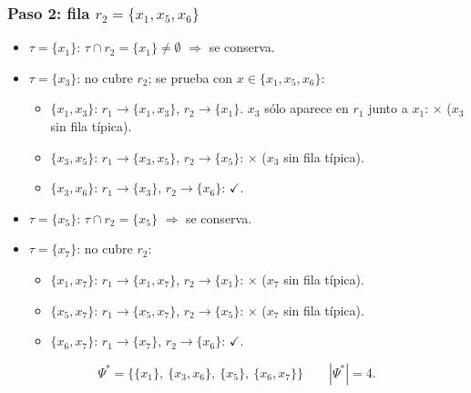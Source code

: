 \documentclass[11pt, a4paper]{article}
\theoremstyle{definition}
\theoremstyle{plain}
\newcommand{\Psis}{\Psi^{*}}
\newcommand{\x}[1]{x_{#1}}
\newcommand{\cj}[1]{\{#1\}}
\newcommand{\si}{\textcolor{green!50!black}{\ensuremath{\checkmark}}}
\newcommand{\no}{\textcolor{red!70!black}{\ensuremath{\times}}}
\begin{document}
\subsubsection*{Paso 2: fila $r_2=\cj{\x1,\x5,\x6}$}
\begin{itemize}[nosep]
\item $\tau=\cj{\x1}$: $\tau\cap r_2=\cj{\x1}\neq\emptyset$ $\Rightarrow$ se conserva.
\item $\tau=\cj{\x3}$: no cubre $r_2$; se prueba con $x\in\cj{\x1,\x5,\x6}$:
  \begin{itemize}[nosep]
  \item $\cj{\x1,\x3}$: $r_1\to\cj{\x1,\x3}$, $r_2\to\cj{\x1}$. $\x3$ sólo aparece en $r_1$ junto a $\x1$: \no{} ($\x3$ sin fila típica).
  \item $\cj{\x3,\x5}$: $r_1\to\cj{\x3,\x5}$, $r_2\to\cj{\x5}$: \no{} ($\x3$ sin fila típica).
  \item $\cj{\x3,\x6}$: $r_1\to\cj{\x3}$, $r_2\to\cj{\x6}$: \si.
  \end{itemize}
\item $\tau=\cj{\x5}$: $\tau\cap r_2=\cj{\x5}$ $\Rightarrow$ se conserva.
\item $\tau=\cj{\x7}$: no cubre $r_2$:
  \begin{itemize}[nosep]
  \item $\cj{\x1,\x7}$: $r_1\to\cj{\x1,\x7}$, $r_2\to\cj{\x1}$: \no{} ($\x7$ sin fila típica).
  \item $\cj{\x5,\x7}$: $r_1\to\cj{\x5,\x7}$, $r_2\to\cj{\x5}$: \no{} ($\x7$ sin fila típica).
  \item $\cj{\x6,\x7}$: $r_1\to\cj{\x7}$, $r_2\to\cj{\x6}$: \si.
  \end{itemize}
\end{itemize}
\[
\Psis=\big\{\cj{\x1},\ \cj{\x3,\x6},\ \cj{\x5},\ \cj{\x6,\x7}\big\}\qquad |\Psis|=4.
\]
\end{document}
